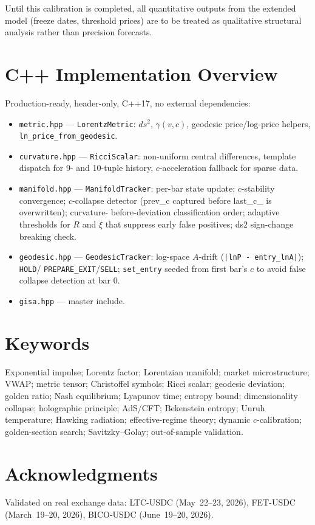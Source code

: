 \documentclass[12pt,a4paper]{article}
\begin{document}
Until this calibration is completed, all quantitative outputs from
the extended model (freeze dates, threshold prices) are to be treated
as qualitative structural analysis rather than precision forecasts.

\appendix

\section{C++ Implementation Overview}

Production-ready, header-only, C++17, no external dependencies:

\begin{itemize}
    \item \texttt{metric.hpp} --- \texttt{LorentzMetric}: $ds^2$,
          $\gamma(v,c)$, geodesic price/log-price helpers,
          \texttt{ln\_price\_from\_geodesic}.
    \item \texttt{curvature.hpp} --- \texttt{RicciScalar}: non-uniform
          central differences, template dispatch for 9- and 10-tuple
          history, $c$-acceleration fallback for sparse data.
    \item \texttt{manifold.hpp} --- \texttt{ManifoldTracker}: per-bar
          state update; $c$-stability convergence; $c$-collapse detector
          (prev\_c captured before last\_c\_ is overwritten); curvature-
          before-deviation classification order; adaptive thresholds for
          $R$ and $\xi$ that suppress early false positives; ds2
          sign-change breaking check.
    \item \texttt{geodesic.hpp} --- \texttt{GeodesicTracker}: log-space
          $A$-drift (\texttt{|lnP - entry\_lnA|}); \texttt{HOLD}/
          \texttt{PREPARE\_EXIT}/\texttt{SELL}; \texttt{set\_entry}
          seeded from first bar's $c$ to avoid false collapse detection
          at bar 0.
    \item \texttt{gisa.hpp} --- master include.
\end{itemize}

\section*{Keywords}

Exponential impulse; Lorentz factor; Lorentzian manifold; market
microstructure; VWAP; metric tensor; Christoffel symbols; Ricci scalar;
geodesic deviation; golden ratio; Nash equilibrium; Lyapunov time; entropy
bound; dimensionality collapse; holographic principle; AdS/CFT;
Bekenstein entropy; Unruh temperature; Hawking radiation; effective-regime
theory; dynamic $c$-calibration; golden-section search; Savitzky--Golay;
out-of-sample validation.

\section*{Acknowledgments}

Validated on real exchange data: LTC-USDC (May~22--23, 2026), FET-USDC
(March~19--20, 2026), BICO-USDC (June~19--20, 2026).
\end{document}
